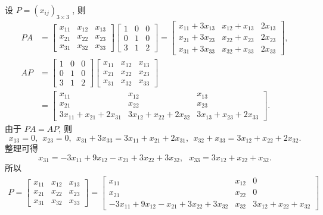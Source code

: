 \documentclass[11pt,a4paper,openany,oneside]{book}
\begin{document}
设 $ P = (x_{ij})_{3\times3} $ , 则
\begin{align*}
PA &= 
\begin{bmatrix}
x_{11} & x_{12} & x_{13} \\
x_{21} & x_{22} & x_{23} \\
x_{31} & x_{32} & x_{33} 
\end{bmatrix} 
\begin{bmatrix}
1 & 0 & 0 \\
0 & 1 & 0 \\
3 & 1 & 2 
\end{bmatrix}
=
\begin{bmatrix}
x_{11} + 3x_{13} & x_{12} + x_{13} & 2x_{13} \\
x_{21} + 3x_{23} & x_{22} + x_{23} & 2x_{23} \\
x_{31} + 3x_{33} & x_{32} + x_{33} & 2x_{33}
\end{bmatrix},\\
AP &= 
\begin{bmatrix}
1 & 0 & 0 \\
0 & 1 & 0 \\
3 & 1 & 2 
\end{bmatrix}
\begin{bmatrix}
x_{11} & x_{12} & x_{13} \\
x_{21} & x_{22} & x_{23} \\
x_{31} & x_{32} & x_{33} 
\end{bmatrix} \\
&=
\begin{bmatrix}
x_{11} & x_{12} & x_{13} \\
x_{21} & x_{22} & x_{23} \\
3x_{11} + x_{21} + 2x_{31} & 3x_{12} + x_{22} + 2x_{32} & 3x_{13} + x_{23} + 2x_{33}
\end{bmatrix}.
\end{align*}
由于 $ PA = AP $, 则
 $$  x_{13} = 0, \ \ x_{23} = 0, \ \ x_{31}+3x_{33} = 3x_{11} + x_{21} + 2x_{31}, \ \ x_{32} + x_{33} = 3x_{12} + x_{22} + 2x_{32}. $$ 
整理可得
 $$  x_{31} = -3x_{11} +  9x_{12} -x_{21} + 3x_{22} + 3x_{32}, \ \ \ x_{33} = 3x_{12} + x_{22} + x_{32} . $$ 
所以
\begin{gather*}
P = 
\begin{bmatrix}
x_{11} & x_{12} & x_{13} \\
x_{21} & x_{22} & x_{23}\\
x_{31} & x_{32} & x_{33}
\end{bmatrix}
=
\begin{bmatrix}
x_{11} & x_{12} & 0 \\
x_{21} & x_{22} & 0\\
-3x_{11} +  9x_{12} -x_{21} + 3x_{22} + 3x_{32} & x_{32} & 3x_{12} + x_{22} + x_{32}
\end{bmatrix} 
\end{gather*}
\end{document}
